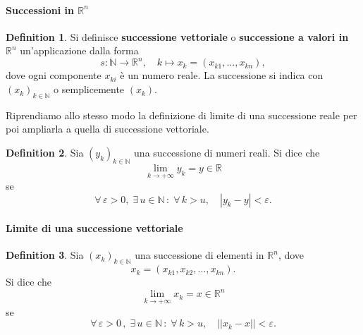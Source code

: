 \documentclass{article}
\theoremstyle{plain}
\theoremstyle{definition}
\newtheorem{defn}{Definition}[section]
\theoremstyle{remark}
\begin{document}
\vspace{10pt}

\paragraph{Successioni in $\mathbb{R}^n$}
\begin{bxthm}
\begin{defn}
    Si definisce \textbf{successione vettoriale} o \textbf{successione a valori in $\mathbb{R}^n$} un'applicazione dalla forma
    \[s:\mathbb{N}\to\mathbb{R}^n, \quad k\mapsto x_k=(x_{k1},\ldots,x_{kn}),\]
    dove ogni componente $x_{ki}$ è un numero reale. La successione si indica con $(x_k)_{k\in\mathbb{N}}$ o semplicemente $(x_k)$.
\end{defn}
\end{bxthm}

\vspace{10pt}

Riprendiamo allo stesso modo la definizione di limite di una successione reale per poi ampliarla a quella di successione vettoriale.

\vspace{10pt}

\begin{bxthm}
\begin{defn}
    Sia $(y_k)_{k\in\mathbb{N}}$ una successione di numeri reali. Si dice che 
    \[\lim_{k\to+\infty} y_k = y \in \mathbb{R}\]
    se \[\forall\,\varepsilon>0,\; \exists\, u\in\mathbb{N}\,:\;\forall\, k>u,\quad |y_k-y|<\varepsilon.\]
\end{defn}
\end{bxthm}

\vspace{10pt}

\paragraph{Limite di una successione vettoriale}
\begin{bxthm}
\begin{defn}
    Sia $(x_k)_{k\in\mathbb{N}}$ una successione di elementi in $\mathbb{R}^n$, dove 
    \[x_k=(x_{k1}, x_{k2}, \dots, x_{kn}). \]
    Si dice che 
    \[\lim_{k\to+\infty} x_k = x \in \mathbb{R}^n\]
    se
    \[\forall\,\varepsilon>0\,,\; \exists\, u\in\mathbb{N}\,:\;\forall\, k>u,\quad ||x_k-x||<\varepsilon.\]
\end{defn}
\end{bxthm}
\end{document}
